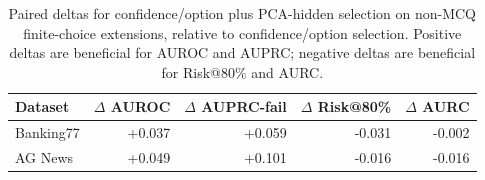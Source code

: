 
\begin{table}[t]
\centering
\small
\caption{Paired deltas for confidence/option plus PCA-hidden selection on non-MCQ finite-choice extensions, relative to confidence/option selection. Positive deltas are beneficial for AUROC and AUPRC; negative deltas are beneficial for Risk@80\% and AURC.}
\label{tab:nonmcq-extension-deltas}
\begin{tabular}{lrrrr}
\toprule
Dataset & $\Delta$ AUROC & $\Delta$ AUPRC-fail & $\Delta$ Risk@80\% & $\Delta$ AURC \\
\midrule
Banking77 & +0.037 & +0.059 & -0.031 & -0.002 \\
AG News & +0.049 & +0.101 & -0.016 & -0.016 \\
\bottomrule
\end{tabular}
\end{table}
